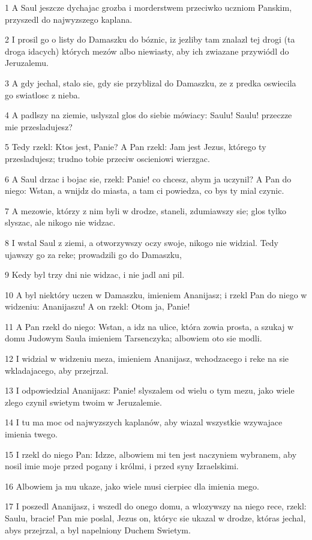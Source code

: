 \par 1 A Saul jeszcze dychajac grozba i morderstwem przeciwko uczniom Panskim, przyszedl do najwyzszego kaplana.
\par 2 I prosil go o listy do Damaszku do bóznic, iz jezliby tam znalazl tej drogi (ta droga idacych) których mezów albo niewiasty, aby ich zwiazane przywiódl do Jeruzalemu.
\par 3 A gdy jechal, stalo sie, gdy sie przyblizal do Damaszku, ze z predka oswiecila go swiatlosc z nieba.
\par 4 A padlszy na ziemie, uslyszal glos do siebie mówiacy: Saulu! Saulu! przeczze mie przesladujesz?
\par 5 Tedy rzekl: Ktos jest, Panie? A Pan rzekl: Jam jest Jezus, którego ty przesladujesz; trudno tobie przeciw oscieniowi wierzgac.
\par 6 A Saul drzac i bojac sie, rzekl: Panie! co chcesz, abym ja uczynil? A Pan do niego: Wstan, a wnijdz do miasta, a tam ci powiedza, co bys ty mial czynic.
\par 7 A mezowie, którzy z nim byli w drodze, staneli, zdumiawszy sie; glos tylko slyszac, ale nikogo nie widzac.
\par 8 I wstal Saul z ziemi, a otworzywszy oczy swoje, nikogo nie widzial. Tedy ujawszy go za reke; prowadzili go do Damaszku,
\par 9 Kedy byl trzy dni nie widzac, i nie jadl ani pil.
\par 10 A byl niektóry uczen w Damaszku, imieniem Ananijasz; i rzekl Pan do niego w widzeniu: Ananijaszu! A on rzekl: Otom ja, Panie!
\par 11 A Pan rzekl do niego: Wstan, a idz na ulice, która zowia prosta, a szukaj w domu Judowym Saula imieniem Tarsenczyka; albowiem oto sie modli.
\par 12 I widzial w widzeniu meza, imieniem Ananijasz, wchodzacego i reke na sie wkladajacego, aby przejrzal.
\par 13 I odpowiedzial Ananijasz: Panie! slyszalem od wielu o tym mezu, jako wiele zlego czynil swietym twoim w Jeruzalemie.
\par 14 I tu ma moc od najwyzszych kaplanów, aby wiazal wszystkie wzywajace imienia twego.
\par 15 I rzekl do niego Pan: Idzze, albowiem mi ten jest naczyniem wybranem, aby nosil imie moje przed pogany i królmi, i przed syny Izraelskimi.
\par 16 Albowiem ja mu ukaze, jako wiele musi cierpiec dla imienia mego.
\par 17 I poszedl Ananijasz, i wszedl do onego domu, a wlozywszy na niego rece, rzekl: Saulu, bracie! Pan mie poslal, Jezus on, któryc sie ukazal w drodze, któras jechal, abys przejrzal, a byl napelniony Duchem Swietym.

